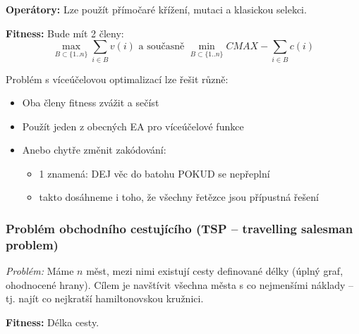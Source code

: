 \textbf{Operátory:} Lze použít přímočaré křížení, mutaci a klasickou selekci.

\textbf{Fitness:} Bude mít 2 členy: 
$$\max\limits_{B \subset \{1..n\}} \sum\limits_{i \in B} v(i) \text{\ \ a současně\ \ } \min\limits_{B \subset \{1..n\}} CMAX - \sum\limits_{i \in B} c(i)$$

Problém s víceúčelovou optimalizací lze řešit různě:
\begin{itemize}
	\leftskip 20pt
	\setlength{\itemsep}{0pt}
	\item Oba členy fitness zvážit a sečíst
	\item Použít jeden z obecných EA pro víceúčelové funkce
	\item Anebo chytře změnit zakódování:
	\begin{itemize}	
		\setlength{\itemsep}{0pt}
		\leftskip 20pt
		\item 1 znamená: DEJ věc do batohu POKUD se nepřeplní
		\item takto dosáhneme i toho, že všechny řetězce jsou přípustná řešení
	\end{itemize}
\end{itemize}

\subsubsection{Problém obchodního cestujícího (TSP -- travelling salesman problem)}
\textit{Problém:} Máme $n$ měst, mezi nimi existují cesty definované délky (úplný graf, ohodnocené hrany). Cílem je navštívit všechna města s co nejmenšími náklady -- tj. najít co nejkratší hamiltonovskou kružnici.

\textbf{Fitness:} Délka cesty.

